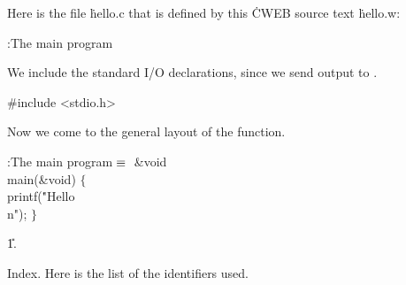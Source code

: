 


Here is the file \.{hello.c} that is defined
by this \.{CWEB} source text \.{hello.w}:

\Y\B{}:The main program\X\par
\fi

We include the standard I/O declarations, since we send output to .

#include <stdio.h>

\fi

Now we come to the general layout of the  function.

\Y\B\4:The main program\X${}\equiv{}$\6
\1\1\&{void} \\{main}(\&{void})\2\2\6
${}\{{}$\1\6
\\{printf}(\.{"Hello\\n"});\6
\4${}\}{}$\2\par
\U1.\fi

Index.
Here is the list of the identifiers used.
\fi

\inx
\fin
\con
